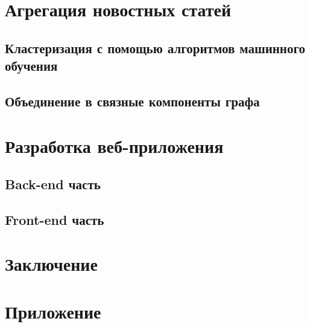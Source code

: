 \documentclass[a4paper, 14pt]{extarticle}
\begin{document}
\section{Агрегация новостных статей}
\subsection{Кластеризация с помощью алгоритмов машинного обучения}
\subsection{Объединение в связные компоненты графа}
\section{Разработка веб-приложения}
\subsection{Back-end часть}
\subsection{Front-end часть}

\section{Заключение}


\setcounter{secnumdepth}{0}
\section{Приложение}
\end{document}
